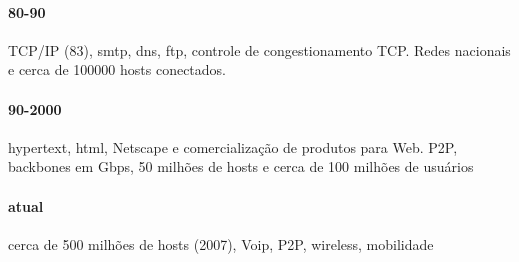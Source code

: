 \paragraph{80-90} TCP/IP (83), smtp, dns, ftp, controle de congestionamento TCP. Redes nacionais e cerca de 100000 hosts conectados.
\paragraph{90-2000} hypertext, html, Netscape e comercialização de produtos para Web. P2P, backbones em Gbps, 50 milhões de hosts e cerca de 100 milhões de usuários
\paragraph{atual} cerca de 500 milhões de hosts (2007), Voip, P2P, wireless, mobilidade

